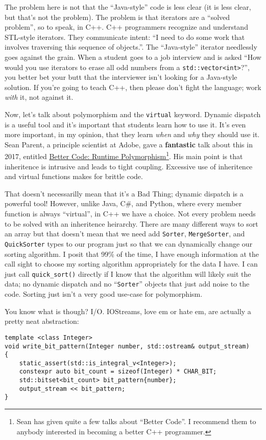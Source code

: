 \documentclass{article}
\begin{document}
The problem here is not that the ``Java-style'' code is less clear (it is less clear, but that's not the problem).  The problem is that iterators are a ``solved problem'', so to speak, in C++.  C++ programmers recognize and understand STL-style iterators. They communicate intent: ``I need to do some work that involves traversing this sequence of objects.''.  The ``Java-style'' iterator needlessly goes against the grain.  When a student goes to a job interview and is asked ``How would you use iterators to erase all odd numbers from a \lstinline{std::vector<int>}?'', you better bet your butt that the interviewer isn't looking for a Java-style solution.  If you're going to teach C++, then please don't fight the language; work \emph{with} it, not against it.

Now, let's talk about polymorphism and the \lstinline{virtual} keyword.  Dynamic dispatch is a useful tool and it's important that students learn how to use it.  It's even more important, in my opinion, that they learn \emph{when} and \emph{why} they should use it.  Sean Parent, a principle scientist at Adobe, gave a \textbf{fantastic} talk about this in 2017, entitled \href{https://www.youtube.com/watch?v=QGcVXgEVMJg}{Better Code: Runtime Polymorphism}\footnote{Sean has given quite a few talks about ``Better Code''.  I recommend them to anybody interested in becoming a better C++ programmer.}.  His main point is that inheritence is intrusive and leads to tight coupling.  Excessive use of inheritence and virtual functions makes for brittle code.  

That doesn't necessarilly mean that it's a Bad Thing; dynamic dispatch is a powerful tool!  However, unlike Java, C\#, and Python, where every member function is always ``virtual'', in C++ we have a choice.  Not every problem needs to be solved with an inheritence heirarchy.  There are many different ways to sort an array but that doesn't mean that we need add \lstinline{Sorter}, \lstinline{MergeSorter}, and \lstinline{QuickSorter} types to our program just so that we can dynamically change our sorting algorithm.  I posit that 99\% of the time, I have enough information at the call sight to choose my sorting algorithm appropriately for the data I have.  I can just call \lstinline{quick_sort()} directly if I know that the algorithm will likely suit the data; no dynamic dispatch and no ``\lstinline{Sorter}'' objects that just add noise to the code.  Sorting just isn't a very good use-case for polymorphism.

You know what is though?  I/O.  IOStreams, love em or hate em, are actually a pretty neat abstraction: 
\begin{lstlisting}
template <class Integer>
void write_bit_pattern(Integer number, std::ostream& output_stream)
{
	static_assert(std::is_integral_v<Integer>);
	constexpr auto bit_count = sizeof(Integer) * CHAR_BIT;
	std::bitset<bit_count> bit_pattern{number};
	output_stream << bit_pattern; 
}
\end{lstlisting}
\end{document}
